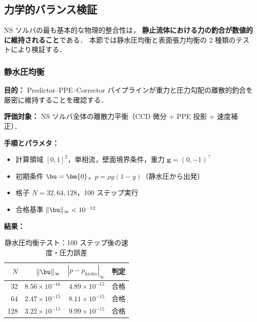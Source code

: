 %
\subsection{力学的バランス検証}
\label{sec:force_balance}

NS ソルバの最も基本的な物理的整合性は，
\textbf{静止流体における力の釣合が数値的に維持されること}である．
本節では静水圧均衡と表面張力均衡の 2 種類のテストにより検証する．

\subsubsection{静水圧均衡}
\label{sec:hydrostatic}

\noindent\textbf{目的：}
Predictor--PPE--Corrector パイプラインが重力と圧力勾配の離散的釣合を
厳密に維持することを確認する．

\noindent\textbf{評価対象：}
NS ソルバ全体の離散力平衡（CCD 微分 + PPE 投影 + 速度補正）．

\noindent\textbf{手順とパラメタ：}
\begin{itemize}[noitemsep]
  \item 計算領域 $[0,1]^2$，単相流，壁面境界条件，重力 $\bm{g} = (0, -1)^\top$
  \item 初期条件 $\bu = \bm{0}$，$p = \rho g (1-y)$（静水圧から出発）
  \item 格子 $N = 32, 64, 128$，100 ステップ実行
  \item 合格基準 $\|\bu\|_\infty < 10^{-12}$
\end{itemize}

\noindent\textbf{結果：}

\begin{table}[htbp]
\centering
\caption{静水圧均衡テスト：100 ステップ後の速度・圧力誤差}
\label{tab:hydrostatic}
\renewcommand{\arraystretch}{1.3}
\begin{tabular}{rrrc}
\toprule
$N$ & $\|\bu\|_\infty$ & $|p - p_{\mathrm{hydro}}|_\infty$ & 判定 \\
\midrule
32  & $8.56 \times 10^{-16}$ & $4.89 \times 10^{-15}$ & 合格 \\
64  & $2.47 \times 10^{-15}$ & $8.11 \times 10^{-15}$ & 合格 \\
128 & $3.22 \times 10^{-15}$ & $9.99 \times 10^{-15}$ & 合格 \\
\bottomrule
\end{tabular}
\end{table}

